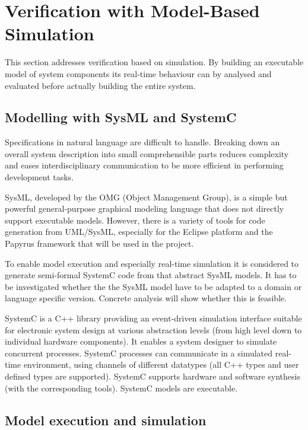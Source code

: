 
\chapter{Verification with Model-Based Simulation}
\label{sct:uro:systemc}


This section addresses verification based on simulation. By building
an executable model of system components its real-time behaviour can
by analysed and evaluated before actually building the entire system.

\section{Modelling with SysML and SystemC}

Specifications in natural language are difficult to handle. Breaking
down an overall system description into small comprehensible parts
reduces complexity and eases interdisciplinary communication to be
more efficient in performing development tasks.

SysML, developed by the OMG (Object Management Group), is a simple but
powerful general-purpose graphical modeling language that does not
directly support executable models. However, there is a variety of
tools for code generation from UML/SysML, especially for the Eclipse
platform and the Papyrus framework that will be used in the project.

To enable model execution and especially real-time simulation it is
considered to generate semi-formal SystemC code from that abstract
SysML models. It has to be investigated whether the the SysML model
have to be adapted to a domain or language specific version. Concrete
analysis will show whether this is feasible.

SystemC is a C++ library providing an event-driven simulation
interface suitable for electronic system design at various abstraction
levels (from high level down to individual hardware components). It
enables a system designer to simulate concurrent processes. SystemC
processes can communicate in a simulated real-time environment, using
channels of different datatypes (all C++ types and user defined types
are supported). SystemC supports hardware and software synthesis (with
the corresponding tools). SystemC models are executable.

\section{Model execution and simulation}

